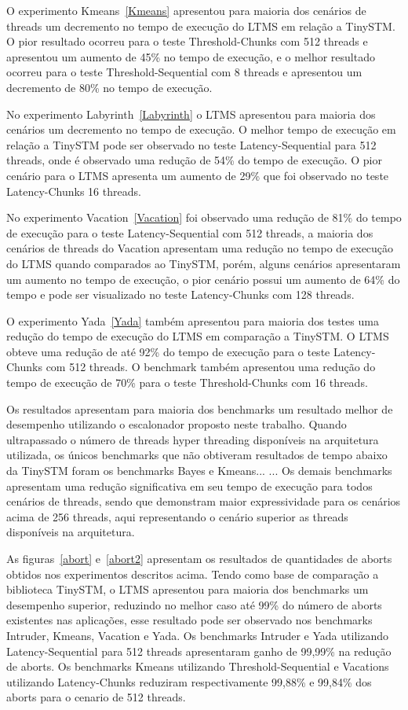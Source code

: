 \documentclass[diss,capa]{texufpel}
\begin{document}
O experimento Kmeans~\ref{Kmeans} apresentou para maioria dos cenários de threads um decremento no tempo de execução do LTMS em relação a TinySTM. O pior resultado ocorreu para o teste Threshold-Chunks com 512 threads e apresentou um aumento de 45\% no tempo de execução, e o melhor resultado ocorreu para o teste Threshold-Sequential com 8 threads e apresentou um decremento de 80\% no tempo de execução.



No experimento Labyrinth~\ref{Labyrinth} o LTMS apresentou para maioria dos cenários um decremento no tempo de execução. O melhor tempo de execução em relação a TinySTM pode ser observado no teste Latency-Sequential para 512 threads, onde é observado uma redução de 54\% do tempo de execução. O pior cenário para o LTMS apresenta um aumento de 29\% que foi observado no teste Latency-Chunks 16 threads.

No experimento Vacation~\ref{Vacation} foi observado uma redução de 81\% do tempo de execução para o teste Latency-Sequential com 512 threads, a maioria dos cenários de threads do Vacation apresentam uma redução no tempo de execução do LTMS quando comparados ao TinySTM, porém, alguns cenários apresentaram um aumento no tempo de execução, o pior cenário possui um aumento de 64\% do tempo e pode ser visualizado no teste Latency-Chunks com 128 threads.

O experimento Yada~\ref{Yada} também apresentou para maioria dos testes uma redução do tempo de execução do LTMS em comparação a TinySTM. O LTMS obteve uma redução de até 92\% do tempo de execução para o teste Latency-Chunks com 512 threads. O benchmark também apresentou uma redução do tempo de execução de 70\% para o teste Threshold-Chunks com 16 threads.

Os resultados apresentam para maioria dos benchmarks um resultado melhor de desempenho utilizando o escalonador proposto neste trabalho. Quando ultrapassado o número de threads hyper threading disponíveis na arquitetura utilizada, os únicos benchmarks que não obtiveram resultados de tempo abaixo da TinySTM foram os benchmarks Bayes e Kmeans...  ... Os demais benchmarks apresentam uma redução significativa em seu tempo de execução para todos cenários de threads, sendo que demonstram maior expressividade para os cenários acima de 256 threads, aqui representando o cenário superior as threads disponíveis na arquitetura.



As figuras~\ref{abort} e~\ref{abort2} apresentam os resultados de quantidades de aborts obtidos nos experimentos descritos acima. Tendo como base de comparação a biblioteca TinySTM, o LTMS apresentou para maioria dos benchmarks um desempenho superior, reduzindo no melhor caso até 99\% do número de aborts existentes nas aplicações, esse resultado pode ser observado nos benchmarks Intruder, Kmeans, Vacation e Yada. Os benchmarks Intruder e Yada utilizando Latency-Sequential para 512 threads apresentaram ganho de 99,99\% na redução de aborts. Os benchmarks Kmeans utilizando Threshold-Sequential e Vacations utilizando Latency-Chunks reduziram respectivamente 99,88\% e 99,84\% dos aborts para o cenario de 512 threads.
\end{document}
